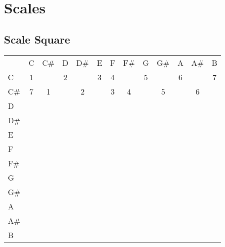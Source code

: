 \section{Scales}

\subsection{Scale Square}

\begin{tabular}{ l | *{12}{c|} }
	     & C & C\# & D & D\# & E & F & F\# & G & G\# & A & A\# & B \\
	C    & 1 &     & 2 &     & 3 & 4 &     & 5 &     & 6 &     & 7 \\
	C\#  & 7 &   1 &   &   2 &   & 3 &   4 &   &   5 &   &   6 &   \\
    D    &   &     &   &     &   &   &     &   &     &   &     &   \\
    D\#  &   &     &   &     &   &   &     &   &     &   &     &   \\
    E    &   &     &   &     &   &   &     &   &     &   &     &   \\
    F    &   &     &   &     &   &   &     &   &     &   &     &   \\
    F\#  &   &     &   &     &   &   &     &   &     &   &     &   \\
    G    &   &     &   &     &   &   &     &   &     &   &     &   \\
    G\#  &   &     &   &     &   &   &     &   &     &   &     &   \\
    A    &   &     &   &     &   &   &     &   &     &   &     &   \\
    A\#  &   &     &   &     &   &   &     &   &     &   &     &   \\
    B    &   &     &   &     &   &   &     &   &     &   &     &   \\
   
	
\end{tabular}
